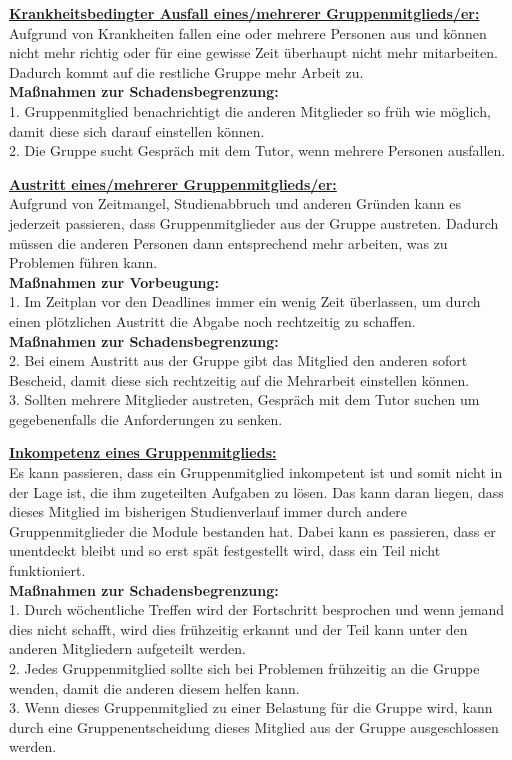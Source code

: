 \documentclass[fontsize=12pt,paper=a4,twoside]{scrartcl}
\begin{document}
\bigskip 

\textbf{\underline{Krankheitsbedingter Ausfall eines/mehrerer Gruppenmitglieds/er:}}\\
Aufgrund von Krankheiten fallen eine oder mehrere Personen aus und können nicht mehr richtig oder für eine gewisse Zeit überhaupt nicht mehr mitarbeiten. Dadurch kommt auf die restliche Gruppe mehr Arbeit zu.\\
\textbf{Maßnahmen zur Schadensbegrenzung:}\\
1. Gruppenmitglied benachrichtigt die anderen Mitglieder so früh wie möglich, damit diese sich darauf einstellen können.\\
2. Die Gruppe sucht Gespräch mit dem Tutor, wenn mehrere Personen ausfallen.\\

\bigskip 

\textbf{\underline{Austritt eines/mehrerer Gruppenmitglieds/er:}}\\
Aufgrund von Zeitmangel, Studienabbruch und anderen Gründen kann es jederzeit passieren, dass Gruppenmitglieder aus der Gruppe austreten. Dadurch müssen die anderen Personen dann entsprechend mehr arbeiten, was zu Problemen führen kann.\\
\textbf{Maßnahmen zur Vorbeugung:}\\
1. Im Zeitplan vor den Deadlines immer ein wenig Zeit überlassen, um durch einen plötzlichen Austritt die Abgabe noch rechtzeitig zu schaffen.\\
\textbf{Maßnahmen zur Schadensbegrenzung:}\\
2. Bei einem Austritt aus der Gruppe gibt das Mitglied den anderen sofort Bescheid, damit diese sich rechtzeitig auf die Mehrarbeit einstellen können.\\
3. Sollten mehrere Mitglieder austreten, Gespräch mit dem Tutor suchen um gegebenenfalls die Anforderungen zu senken.\\

\bigskip 

\textbf{\underline{Inkompetenz eines Gruppenmitglieds:}}\\
Es kann passieren, dass ein Gruppenmitglied inkompetent ist und somit nicht in der Lage ist, die ihm zugeteilten Aufgaben zu lösen. Das kann daran liegen, dass dieses Mitglied im bisherigen Studienverlauf immer durch andere Gruppenmitglieder die Module bestanden hat. Dabei kann es passieren, dass er unentdeckt bleibt und so erst spät festgestellt wird, dass ein Teil nicht funktioniert.\\
\textbf{Maßnahmen zur Schadensbegrenzung:}\\
1. Durch wöchentliche Treffen wird der Fortschritt besprochen und wenn jemand dies nicht schafft, wird dies frühzeitig erkannt und der Teil kann unter den anderen Mitgliedern aufgeteilt werden.\\
2. Jedes Gruppenmitglied sollte sich bei Problemen frühzeitig an die Gruppe wenden, damit die anderen diesem helfen kann. \\
3. Wenn dieses Gruppenmitglied zu einer Belastung für die Gruppe wird, kann durch eine Gruppenentscheidung dieses Mitglied aus der Gruppe ausgeschlossen werden. \\
\end{document}
